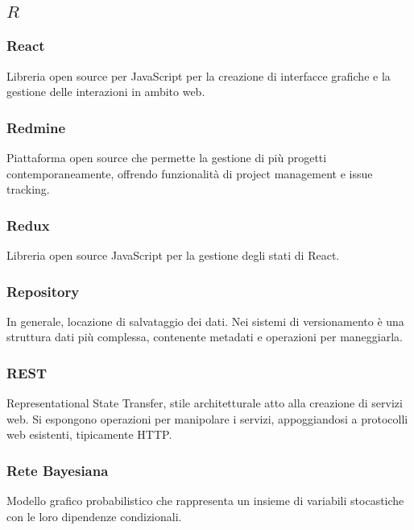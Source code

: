\subsection*{\quad$R\quad$}

\subsubsection*{React}
Libreria open source per JavaScript per la creazione di interfacce grafiche e la gestione delle interazioni in ambito web.

\subsubsection*{Redmine}
Piattaforma open source che permette la gestione di più progetti contemporaneamente, offrendo funzionalità di project management e issue tracking.

\subsubsection*{Redux}
Libreria open source JavaScript per la gestione degli stati di React\glo.

\subsubsection*{Repository}
In generale, locazione di salvataggio dei dati. Nei sistemi di versionamento è una struttura dati più complessa, contenente metadati e operazioni per maneggiarla.

\subsubsection*{REST}
Representational State Transfer, stile architetturale atto alla creazione di servizi web. Si espongono operazioni per manipolare i servizi, appoggiandosi a protocolli web esistenti, tipicamente HTTP.

\subsubsection*{Rete Bayesiana}
Modello grafico probabilistico che rappresenta un insieme di variabili stocastiche con le loro dipendenze condizionali.

